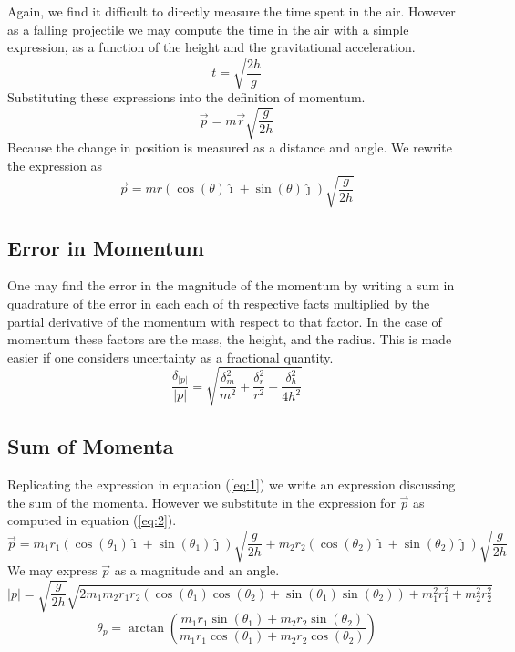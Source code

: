 \documentclass[11pt]{article}
\begin{document}
Again, we find it difficult to directly measure the time spent in the air. However as a falling projectile we may compute the time in the air with a simple expression, as a function of the height and the gravitational acceleration.
\begin{equation}
t = \sqrt{\frac{2h}{g}}
\end{equation}
Substituting these expressions into the definition of momentum.
\begin{equation}
\vec{p} = m \vec{r} \sqrt{ \frac{g}{2 h} } 
\end{equation}
Because the change in position is measured as a distance and angle. We rewrite the expression as
\begin{equation}
\vec{p} =  m r \left(\cos(\theta) \hat{\imath} + \sin(\theta) \hat{\jmath} \right) \sqrt{ \frac{g}{2 h}} \label{eq:2}
\end{equation}
\subsection{Error in Momentum}
One may find the error in the magnitude of the momentum by writing a sum in quadrature of the error in each each of th respective facts multiplied by the partial derivative of the momentum with respect to that factor. In the case of momentum these factors are the mass, the height, and the radius. This is made easier if one considers uncertainty as a fractional quantity.
\begin{equation}
\frac{\delta_{|p|}}{|p|} = \sqrt{\frac{\delta_m^2}{m^2}+\frac{\delta_r^2}{r^2}+\frac{\delta_h^2}{4 h^2}}
\end{equation} 
\subsection{Sum of Momenta}
Replicating the expression in equation (\ref{eq:1}) we write an expression discussing the sum of the momenta. However we substitute in the expression for \(\vec{p}\) as computed in equation (\ref{eq:2}).
\begin{equation}
\vec{p} =  m_1 r_1 \left(\cos(\theta_1) \hat{\imath} + \sin(\theta_1) \hat{\jmath} \right) \sqrt{ \frac{g}{2 h}} + m_2 r_2 \left(\cos(\theta_2) \hat{\imath} + \sin(\theta_2) \hat{\jmath} \right) \sqrt{ \frac{g}{2 h}}
\end{equation}
We may express \( \vec{p} \) as a magnitude and an angle.
\begin{equation}
|p| = \sqrt{\frac{g}{2 h}}\sqrt{2 m_1 m_2 r_1 r_2 \left(\cos(\theta_1)\cos(\theta_2) + \sin(\theta_1)\sin(\theta_2) \right) + m_1^2 r_1^2 + m_2^2 r_2^2}
\end{equation}
\begin{equation}
\theta_p = \arctan \left( {\frac {m_1 r_1 \sin \left( \theta_1 \right) +m_2 r_2 \sin \left( \theta_2 \right) }{m_1 r_1 \cos \left( \theta_1 \right) +m_2 r_2\cos \left( \theta_2 \right) }} \right) 
\end{equation}
\end{document}
